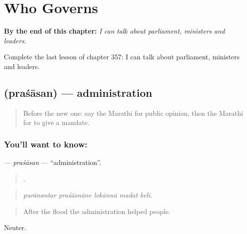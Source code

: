 
\chapter{Who Governs}
\label{ch:mr-who-governs}

\begin{chapteropening}
\textbf{By the end of this chapter:} \emph{I can talk about parliament, ministers and leaders.}

Complete the last lesson of chapter 357: I can talk about parliament, ministers and leaders.
\end{chapteropening}

\section[\texorpdfstring{\mr{प्रशासन} (praśāsan)}{प्रशासन (praśāsan)}]{ (praśāsan) — administration}

\label{lesson:MR-C357-prasasan}



\begin{quote}
Before the new one: say the Marathi for public opinion, then the Marathi for to give a mandate.
\end{quote}

\subsection*{You'll want to know: }
\textbf{} — \emph{praśāsan} — \textquotedblleft{}administration\textquotedblright{}.

\begin{quote}
    .
\end{quote}

\begin{quote}
\emph{purānantar praśāsnāne lokānnā madat kelī.}
\end{quote}

\begin{quote}
After the flood the administration helped people.
\end{quote}

Neuter.

